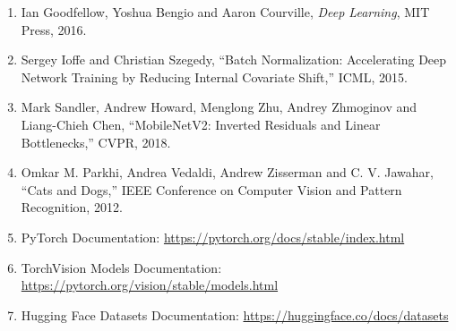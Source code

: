 \documentclass[10pt]{article}
\begin{document}
\begin{enumerate}
\item Ian Goodfellow, Yoshua Bengio and Aaron Courville,
\emph{Deep Learning}, MIT Press, 2016.

\item Sergey Ioffe and Christian Szegedy,
``Batch Normalization: Accelerating Deep Network Training by Reducing
Internal Covariate Shift,'' ICML, 2015.

\item Mark Sandler, Andrew Howard, Menglong Zhu, Andrey Zhmoginov and
Liang-Chieh Chen, ``MobileNetV2: Inverted Residuals and Linear
Bottlenecks,'' CVPR, 2018.

\item Omkar M. Parkhi, Andrea Vedaldi, Andrew Zisserman and C. V. Jawahar,
``Cats and Dogs,'' IEEE Conference on Computer Vision and Pattern
Recognition, 2012.

\item PyTorch Documentation:
\url{https://pytorch.org/docs/stable/index.html}

\item TorchVision Models Documentation:
\url{https://pytorch.org/vision/stable/models.html}

\item Hugging Face Datasets Documentation:
\url{https://huggingface.co/docs/datasets}
\end{enumerate}
\end{document}
